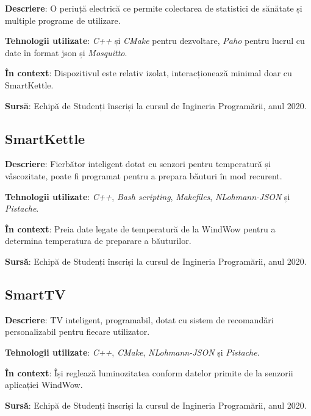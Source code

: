 \textbf{Descriere}: O periuță electrică ce permite colectarea de statistici de sănătate și multiple programe de utilizare.

\textbf{Tehnologii utilizate}: \textit{C++} și \textit{CMake} pentru dezvoltare, \textit{Paho} pentru lucrul cu date în format \acrshort{json} și \textit{Mosquitto}.

\textbf{În context}: Dispozitivul este relativ izolat, interacționează minimal doar cu SmartKettle.

\textbf{Sursă}: Echipă de Studenți înscriși la cursul de Ingineria Programării, anul 2020.

\subsection*{SmartKettle}

\textbf{Descriere}: Fierbător inteligent dotat cu senzori pentru temperatură și vâscozitate, poate fi programat pentru a prepara băuturi în mod recurent.

\textbf{Tehnologii utilizate}: \textit{C++}, \textit{Bash scripting}, \textit{Makefiles}, \textit{NLohmann-JSON} și \textit{Pistache}.

\textbf{În context}: Preia date legate de temperatură de la WindWow pentru a determina temperatura de preparare a băuturilor.

\textbf{Sursă}: Echipă de Studenți înscriși la cursul de Ingineria Programării, anul 2020.

\subsection*{SmartTV}

\textbf{Descriere}: TV inteligent, programabil, dotat cu sistem de recomandări personalizabil pentru fiecare utilizator.

\textbf{Tehnologii utilizate}: \textit{C++}, \textit{CMake}, \textit{NLohmann-JSON} și \textit{Pistache}.

\textbf{În context}: Își reglează luminozitatea conform datelor primite de la senzorii aplicației WindWow.

\textbf{Sursă}: Echipă de Studenți înscriși la cursul de Ingineria Programării, anul 2020.

